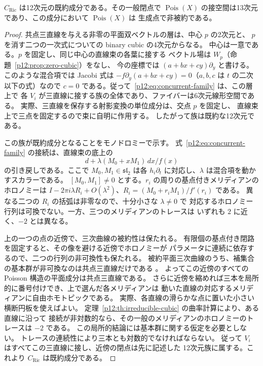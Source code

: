 \begin{theorem}\label{p12:th:concurrent-riccati}
$C_{\mathrm{Ric}}$ は12次元の既約成分である。その一般閉点で
$\operatorname{Pois}(X)$ の接空間は13次元であり、この成分において $\operatorname{Pois}(X)$ は
生成点で非被約である。
\end{theorem}
\begin{proof}
共点三直線を与える非零の平面双ベクトルの層は、中心 $p$ の2次元と、
$p$ を消す二つの一次式についての binary cubic の4次元からなる。
中心は一意である。$p$ を固定し、同じ中心の直線束の各葉に接する
ベクトル場は $W_p$（命題~\ref{p12:prop:zero-cubic}）をなし、
今の座標では $(a+bx+cy)\partial_y$ と書ける。このような混合項では
Jacobi 式は $-f\partial_y(a+bx+cy)=0$（$a,b,c$ は $t$ の二次以下の式）なので
$c=0$ である。従って~\eqref{p12:eq:concurrent-family} は、この層上で
各 $V_i$ が三直線に接する族の全体であり、ファイバーは6次元線形空間である。
実際、三直線を保存する射影変換の単位成分は、交点 $p$ を固定し、
直線束上で三点を固定するので束に自明に作用する。
したがって族は既約な12次元である。

この族が既約成分となることをモノドロミーで示す。
式~\eqref{p12:eq:concurrent-family} の接続は、直線束の底上の
\[
 d+\lambda(M_0+x M_1)\,dx/f(x)
\]
の引き戻しである。ここで $M_0,M_1\in\mathfrak{sl}_2$ は各 $h_i\partial_t$
に対応し、$\lambda$ は混合項を動かすスカラーである。
$[M_0,M_1]\ne0$ とする。$r_i$ の周りの基点付きメリディアンのホロノミーは
$I-2\pi i\lambda R_i+O(\lambda^2)$、$R_i=(M_0+r_iM_1)/f'(r_i)$ である。
異なる二つの $R_i$ の括弧は非零なので、十分小さな $\lambda\ne0$ で
対応するホロノミー行列は可換でない。一方、三つのメリディアンのトレースは
いずれも $2$ に近く、$-2$ とは異なる。

上の一つの点の近傍で、三次曲線の被約性は保たれる。
有限個の基点付き閉路を固定すると、その像を避ける近傍でホロノミーが
パラメータに連続に依存するので、二つの行列の非可換性も保たれる。
被約平面三次曲線のうち、補集合の基本群が非可換なのは共点三直線だけである
\cite[\S2.3.2, (3a)--(3e)]{p12-Cogolludo}。
よってこの近傍のすべての Poisson 構造の平面成分は共点三直線である。
さらに近傍を縮めれば三本を局所的に番号付けでき、上で選んだ各メリディアンは
動いた直線の対応するメリディアンに自由ホモトピックである。
実際、各直線の滑らかな点に置いた小さい横断円板を使えばよい。
定理~\ref{p12:th:irreducible-cubic} の曲率計算により、ある直線に沿って
接続が非対数的なら、その一般のメリディアンのホロノミーのトレースは $-2$ である。
この局所的結論には基本群に関する仮定を必要としない。
トレースの連続性により三本とも対数的でなければならない。
従って $V_i$ はすべてこの三直線に接し、近傍の閉点は先に記述した
12次元族に属する。これより $C_{\mathrm{Ric}}$ は既約成分である。


\end{proof}
